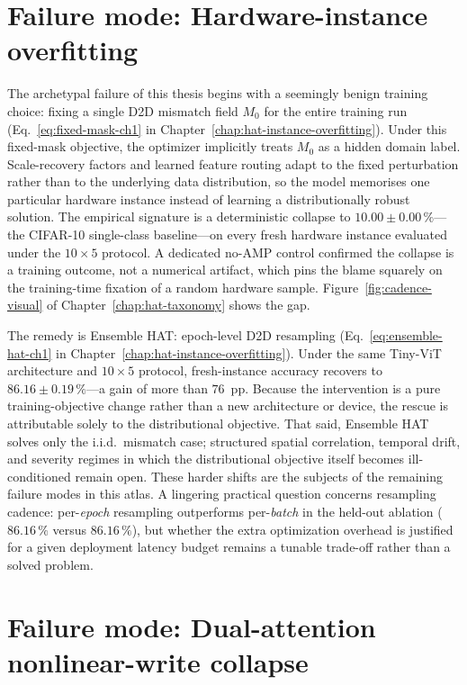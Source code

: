 \section{Failure mode: Hardware-instance overfitting}
\label{sec:failure-instance-overfitting}

The archetypal failure of this thesis begins with a seemingly benign training choice: fixing a single D2D mismatch field $M_{0}$ for the entire training run (Eq.~\ref{eq:fixed-mask-ch1} in Chapter~\ref{chap:hat-instance-overfitting}).  Under this fixed-mask objective, the optimizer implicitly treats $M_{0}$ as a hidden domain label.  Scale-recovery factors and learned feature routing adapt to the fixed perturbation rather than to the underlying data distribution, so the model memorises one particular hardware instance instead of learning a distributionally robust solution.  The empirical signature is a deterministic collapse to $10.00\pm0.00\,\%$---the CIFAR-10 single-class baseline---on every fresh hardware instance evaluated under the $10 \times 5$ protocol.  A dedicated no-AMP control confirmed the collapse is a training outcome, not a numerical artifact, which pins the blame squarely on the training-time fixation of a random hardware sample.  Figure~\ref{fig:cadence-visual} of Chapter~\ref{chap:hat-taxonomy} shows the gap.

The remedy is Ensemble HAT: epoch-level D2D resampling (Eq.~\ref{eq:ensemble-hat-ch1} in Chapter~\ref{chap:hat-instance-overfitting}).  Under the same Tiny-ViT architecture and $10 \times 5$ protocol, fresh-instance accuracy recovers to $86.16\pm0.19\,\%$---a gain of more than $76$~pp.  Because the intervention is a pure training-objective change rather than a new architecture or device, the rescue is attributable solely to the distributional objective.  That said, Ensemble HAT solves only the i.i.d.~mismatch case; structured spatial correlation, temporal drift, and severity regimes in which the distributional objective itself becomes ill-conditioned remain open.  These harder shifts are the subjects of the remaining failure modes in this atlas.  A lingering practical question concerns resampling cadence: per-\emph{epoch} resampling outperforms per-\emph{batch} in the held-out ablation ($86.16\,\%$ versus $86.16\,\%$), but whether the extra optimization overhead is justified for a given deployment latency budget remains a tunable trade-off rather than a solved problem.


\section{Failure mode: Dual-attention nonlinear-write collapse}
\label{sec:failure-dual-attention-nl}

